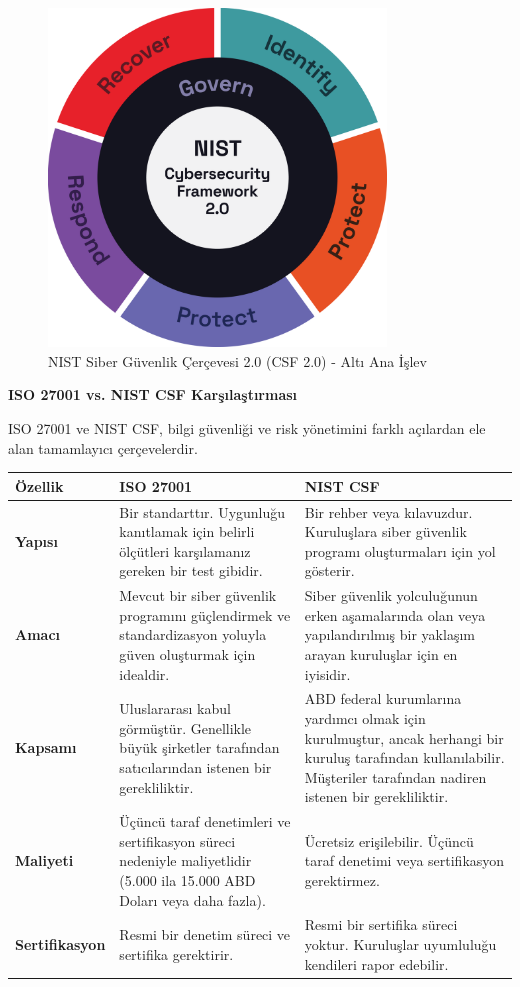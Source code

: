 \begin{figure}[H]
\centering
\includegraphics[width=0.8\textwidth]{img/NIST-cyber-security-framework2.0.png}
\caption{NIST Siber Güvenlik Çerçevesi 2.0 (CSF 2.0) - Altı Ana İşlev}
\label{fig:nist-csf}
\end{figure}

\textbf{ISO 27001 vs. NIST CSF Karşılaştırması}

ISO 27001 ve NIST CSF, bilgi güvenliği ve risk yönetimini farklı açılardan ele alan tamamlayıcı çerçevelerdir.

\begin{adjustbox}{max width=\textwidth}
\begin{tabularx}{\textwidth}{|l|X|X|}
\hline
\textbf{Özellik} & \textbf{ISO 27001} & \textbf{NIST CSF} \\
\hline
\textbf{Yapısı} & Bir standarttır. Uygunluğu kanıtlamak için belirli ölçütleri karşılamanız gereken bir test gibidir. & Bir rehber veya kılavuzdur. Kuruluşlara siber güvenlik programı oluşturmaları için yol gösterir. \\
\hline
\textbf{Amacı} & Mevcut bir siber güvenlik programını güçlendirmek ve standardizasyon yoluyla güven oluşturmak için idealdir. & Siber güvenlik yolculuğunun erken aşamalarında olan veya yapılandırılmış bir yaklaşım arayan kuruluşlar için en iyisidir. \\
\hline
\textbf{Kapsamı} & Uluslararası kabul görmüştür. Genellikle büyük şirketler tarafından satıcılarından istenen bir gerekliliktir. & ABD federal kurumlarına yardımcı olmak için kurulmuştur, ancak herhangi bir kuruluş tarafından kullanılabilir. Müşteriler tarafından nadiren istenen bir gerekliliktir. \\
\hline
\textbf{Maliyeti} & Üçüncü taraf denetimleri ve sertifikasyon süreci nedeniyle maliyetlidir (5.000 ila 15.000 ABD Doları veya daha fazla). & Ücretsiz erişilebilir. Üçüncü taraf denetimi veya sertifikasyon gerektirmez. \\
\hline
\textbf{Sertifikasyon} & Resmi bir denetim süreci ve sertifika gerektirir. & Resmi bir sertifika süreci yoktur. Kuruluşlar uyumluluğu kendileri rapor edebilir. \\
\hline
\end{tabularx}
\end{adjustbox}

